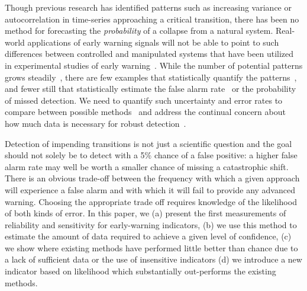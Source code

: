 \documentclass[authoryear,preprint,11pt]{elsarticle}
\begin{document}
Though previous research has identified patterns such as increasing variance or autocorrelation
in time-series approaching a critical transition,
there has been no method for forecasting the \emph{probability} of a collapse from a natural system.
Real-world applications of early warning signals will not be able to point to such differences between controlled and
manipulated systems that have been utilized in experimental studies of early warning~\citep{Drake2010, Carpenter2011}⁠.
While the number of potential patterns grows steadily~\citep{Carpenter2006, Dakos2008, Guttal2008, Guttal2008a, Dakos2011}, %
there are few examples that statistically quantify the patterns~\citep{Dakos2008, Dakos2011},⁠
and fewer still that statistically estimate the false alarm rate~\citep{Dakos2008} or 
the probability of missed detection⁠. 
We need to quantify such uncertainty and error rates to compare between possible methods~\citep{Contamin2009}
and address the continual concern about how much data is necessary⁠ for robust detection~\citep{Scheffer2001, Dakos2008, Carpenter2011, Scheffer2010, Inman2011}.  

Detection of impending transitions is not just a scientific question 
and the goal should not solely be to detect with a 5\% chance of a false positive:
a higher false alarm rate may well be  worth a smaller chance of  missing a catastrophic shift. 
There is an obvious trade-off between the frequency with which a given approach will experience a false alarm and
with which it will fail to provide any advanced warning. 
Choosing the appropriate trade off requires knowledge of the likelihood of both kinds of error.
In this paper, we
(a) present the first measurements of reliability and sensitivity for early-warning indicators, 
(b) we use this method to estimate the amount of data required to achieve a given level of confidence,  
(c) we show where existing methods have performed little better than chance due to a lack of sufficient data or the use of insensitive indicators 
(d) we introduce a new indicator based on likelihood which substantially out-performs the existing methods.     
\end{document}
